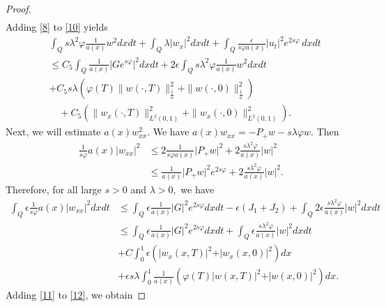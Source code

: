 \documentclass[reqno]{amsart}
\theoremstyle{plain}
\theoremstyle{remark}
\numberwithin{equation}{section}
\begin{document}
\begin{proof}
\begin{equation}
\begin{aligned}
    \end{aligned}
\end{equation}
Adding \eqref{8} to \eqref{10} yields 
\begin{equation}\label{11}
    \begin{split}
         &\int_{Q} s\lambda^2 \varphi \frac{1}{a(x)}w^2 dxdt+ \int_{Q} \lambda \vert w_{x}\vert^2 dx dt+\int_{Q}\frac{\epsilon}{s\varphi a(x)}\vert u_{t}\vert^2 e^{2s\varphi}\, dxdt\\& \leqslant C_{5}  \int_{Q}\frac{1}{a(x)}\vert Ge^{s\varphi}\vert^2 dxdt + 2\epsilon \int_{Q} s\lambda^2\varphi \frac{1}{a(x)}w^2 dxdt \\&+C_{5}s\lambda \left(\varphi(T)\| w(\cdot,T)\|_{\frac{1}{a}}^2+\| w(\cdot,0)\|_{\frac{1}{a}}^2 \right)\\&\quad +C_{5}\left( \| w_{x}(\cdot,T)\|_{L^2(0,1)}^2+\| w_{x}(\cdot,0)\|_{L^2(0,1)}^2\right).
    \end{split}
\end{equation}
Next, we will estimate $ a(x) w_{xx}^2$. We have $a(x) w_{xx}=-P_{+}w-s\lambda \varphi w.$ Then 
\begin{align*}
    \frac{1}{s\varphi}a(x)\vert w_{xx}\vert^2 & \leqslant 2 \frac{1}{s\varphi a(x)}\vert P_{+}w\vert^2 +  2\frac{s \lambda^2 \varphi}{a(x)}\vert w\vert^2 \\ &
   \leqslant \frac{1}{a(x)} \vert P_{+}w \vert^2 e^{2s\varphi}  + 2\frac{s \lambda^2 \varphi}{a(x)}\vert w\vert^2 .
    \end{align*}
Therefore, for all large $s>0$ and $\lambda> 0, $ we have
    \begin{equation}\label{12}
        \begin{split}
            \int_{Q} \epsilon\frac{1}{s\varphi}a(x)\vert w_{xx}\vert^2 dx dt &\leqslant \int_{Q}\epsilon \frac{1}{a(x)} \vert G\vert^2 e^{2s\varphi}dxdt -\epsilon(J_{1}+J_{2}) + \int_{Q}2\epsilon  \frac{s \lambda^2 \varphi}{a(x)}\vert w\vert^2 dx dt\\&
            \leq \int_{Q}\epsilon \frac{1}{a(x)} \vert G\vert^2 e^{2s\varphi}dxdt +\int_{Q}\epsilon  \frac{s \lambda^2 \varphi}{a(x)}\vert w\vert^2 dx dt\\&+C\int_{0}^1\epsilon\left(\vert  w_{x}(x,T)\vert^2+ \vert  w_{x}(x,0)\vert^2\right)dx
            \\&+\epsilon s\lambda \int_{0}^1\frac{1}{a(x)}\left(\varphi(T)\vert w(x,T)\vert^2+\vert w(x,0)\vert^2\right)dx.
        \end{split}
    \end{equation}
    Adding \eqref{11} to \eqref{12}, we obtain 


\end{proof}
\end{document}

